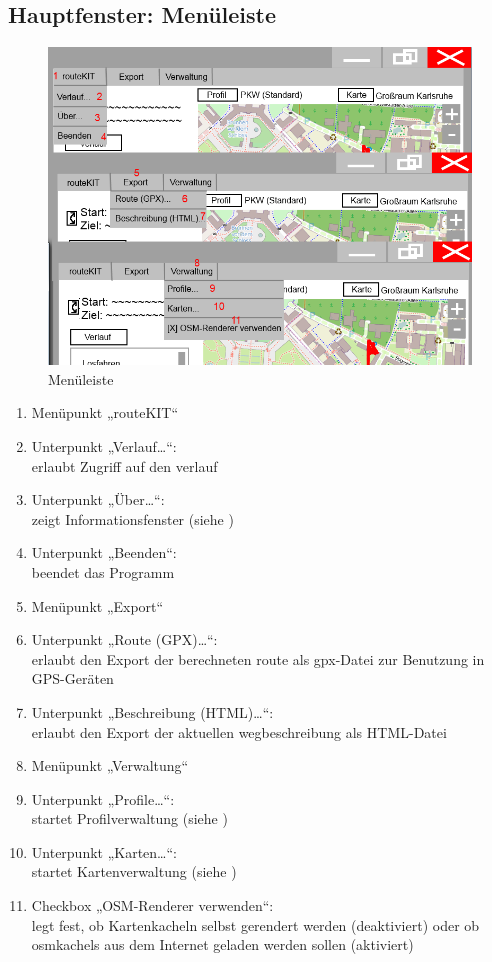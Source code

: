 \documentclass[a4paper, 11pt]{article}
\begin{document}
\subsection{Hauptfenster: Menüleiste}
\begin{figure}[H]
\centering
\includegraphics[width=0.9\linewidth]{mockup_screenshot_menu}
\caption{Menüleiste}
\label{fig:mockupscreenshotmenu}
\end{figure}
\begin{enumerate}
\item Menüpunkt „routeKIT“
\item Unterpunkt „Verlauf\ldots“:\\erlaubt Zugriff auf den \gls{verlauf}
\item Unterpunkt „Über\ldots“:\\
zeigt Informationsfenster (siehe )
\item Unterpunkt „Beenden“:\\
beendet das Programm
\item Menüpunkt „Export“
\item Unterpunkt „Route (GPX)\ldots“:\\
erlaubt den Export der berechneten \gls{route} als \gls{gpx}-Datei zur Benutzung in GPS-Geräten
\item Unterpunkt „Beschreibung (HTML)\ldots“:\\
erlaubt den Export der aktuellen \gls{wegbeschreibung} als HTML-Datei
\item Menüpunkt „Verwaltung“
\item Unterpunkt „Profile\ldots“:\\
startet Profilverwaltung (siehe )
\item Unterpunkt „Karten\ldots“:\\
startet Kartenverwaltung (siehe )
\item Checkbox „OSM-Renderer verwenden“:\\
legt fest, ob Kartenkacheln selbst gerendert werden (deaktiviert) oder ob \glspl{osmkachel} aus dem Internet geladen werden sollen (aktiviert)
\end{enumerate}
\end{document}
